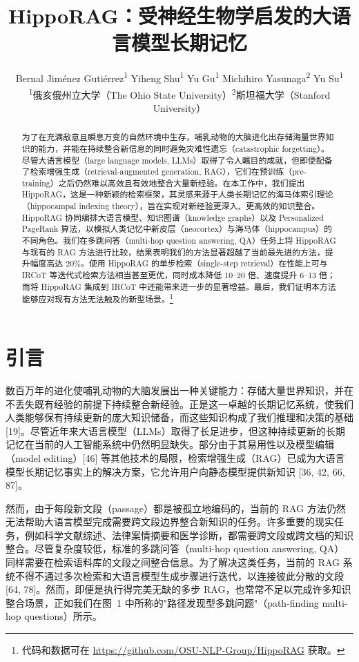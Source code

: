 \documentclass[11pt,UTF8,fontset=fandol]{ctexart}
\title{\textbf{HippoRAG：受神经生物学启发的大语言模型长期记忆}}
\author{Bernal Jiménez Gutiérrez\textsuperscript{1} \quad Yiheng Shu\textsuperscript{1} \quad Yu Gu\textsuperscript{1} \quad Michihiro Yasunaga\textsuperscript{2} \quad Yu Su\textsuperscript{1}\\[0.3em]
\textsuperscript{1}俄亥俄州立大学（The Ohio State University）\quad \textsuperscript{2}斯坦福大学（Stanford University）}
\date{}
\begin{document}
\maketitle

\begin{abstract}
为了在充满敌意且瞬息万变的自然环境中生存，哺乳动物的大脑进化出存储海量世界知识的能力，并能在持续整合新信息的同时避免灾难性遗忘（catastrophic forgetting）。尽管大语言模型（large language models, LLMs）取得了令人瞩目的成就，但即便配备了检索增强生成（retrieval-augmented generation, RAG），它们在预训练（pre-training）之后仍然难以高效且有效地整合大量新经验。在本工作中，我们提出 HippoRAG，这是一种新颖的检索框架，其灵感来源于人类长期记忆的海马体索引理论（hippocampal indexing theory），旨在实现对新经验更深入、更高效的知识整合。HippoRAG 协同编排大语言模型、知识图谱（knowledge graphs）以及 Personalized PageRank 算法，以模拟人类记忆中新皮层（neocortex）与海马体（hippocampus）的不同角色。我们在多跳问答（multi-hop question answering, QA）任务上将 HippoRAG 与现有的 RAG 方法进行比较，结果表明我们的方法显著超越了当前最先进的方法，提升幅度高达 20\%。使用 HippoRAG 的单步检索（single-step retrieval）在性能上可与 IRCoT 等迭代式检索方法相当甚至更优，同时成本降低 10--20 倍、速度提升 6--13 倍；而将 HippoRAG 集成到 IRCoT 中还能带来进一步的显著增益。最后，我们证明本方法能够应对现有方法无法触及的新型场景。\footnote{代码和数据可在 \url{https://github.com/OSU-NLP-Group/HippoRAG} 获取。}
\end{abstract}

\section{引言}

数百万年的进化使哺乳动物的大脑发展出一种关键能力：存储大量世界知识，并在不丢失既有经验的前提下持续整合新经验。正是这一卓越的长期记忆系统，使我们人类能够保有持续更新的庞大知识储备，而这些知识构成了我们推理和决策的基础 [19]。尽管近年来大语言模型（LLMs）取得了长足进步，但这种持续更新的长期记忆在当前的人工智能系统中仍然明显缺失。部分由于其易用性以及模型编辑（model editing）[46] 等其他技术的局限，检索增强生成（RAG）已成为大语言模型长期记忆事实上的解决方案，它允许用户向静态模型提供新知识 [36, 42, 66, 87]。

然而，由于每段新文段（passage）都是被孤立地编码的，当前的 RAG 方法仍然无法帮助大语言模型完成需要跨文段边界整合新知识的任务。许多重要的现实任务，例如科学文献综述、法律案情摘要和医学诊断，都需要跨文段或跨文档的知识整合。尽管复杂度较低，标准的多跳问答（multi-hop question answering, QA）同样需要在检索语料库的文段之间整合信息。为了解决这类任务，当前的 RAG 系统不得不通过多次检索和大语言模型生成步骤进行迭代，以连接彼此分散的文段 [64, 78]。然而，即便是执行得完美无缺的多步 RAG，也常常不足以完成许多知识整合场景，正如我们在图~1 中所称的"路径发现型多跳问题"（path-finding multi-hop questions）所示。
\end{document}
